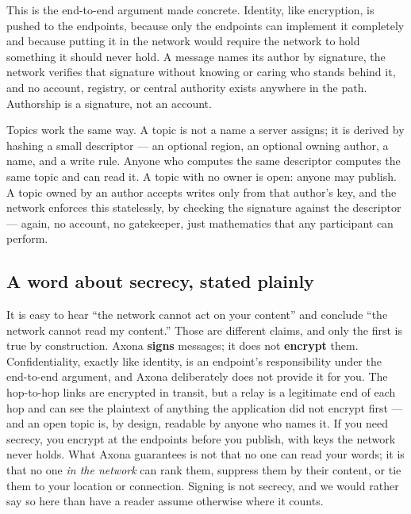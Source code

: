 \documentclass[nobib,justified]{tufte-handout}
\begin{document}
This is the end-to-end argument made concrete. Identity, like encryption, is
pushed to the endpoints, because only the endpoints can implement it completely
and because putting it in the network would require the network to hold
something it should never hold. A message names its author by signature, the
network verifies that signature without knowing or caring who stands behind it,
and no account, registry, or central authority exists anywhere in the path.
Authorship is a signature, not an account.

Topics work the same way. A topic is not a name a server assigns; it is derived
by hashing a small descriptor --- an optional region, an optional owning author,
a name, and a write rule. Anyone who computes the same descriptor computes the
same topic and can read it. A topic with no owner is open: anyone may publish. A
topic owned by an author accepts writes only from that author's key, and the
network enforces this statelessly, by checking the signature against the
descriptor --- again, no account, no gatekeeper, just mathematics that any
participant can perform.

\subsection{A word about secrecy, stated plainly}

It is easy to hear ``the network cannot act on your content'' and conclude ``the
network cannot read my content.'' Those are different claims, and only the first
is true by construction. Axona \textbf{signs} messages; it does not
\textbf{encrypt} them. Confidentiality, exactly like identity, is an endpoint's
responsibility under the end-to-end argument, and Axona deliberately does not
provide it for you. The hop-to-hop links are encrypted in transit, but a relay
is a legitimate end of each hop and can see the plaintext of anything the
application did not encrypt first --- and an open topic is, by design, readable
by anyone who names it. If you need secrecy, you encrypt at the endpoints before
you publish, with keys the network never holds. What
Axona guarantees is not that no one can read your words; it is that no one
\emph{in the network} can rank them, suppress them by their content, or tie them
to your location or connection. Signing is not secrecy, and we would rather say
so here than have a reader assume otherwise where it counts.
\end{document}
